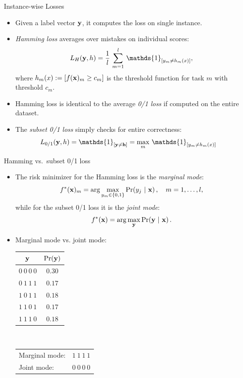 \documentclass[11pt,compress,t,notes=noshow, xcolor=table]{beamer}
\begin{document}
\begin{frame}{Instance-wise Losses}
	\begin{itemize}
		
        \item Given a label vector $\mathbf{y}$, it computes the loss on single instance. 

		\item \emph{Hamming loss} averages over mistakes on individual scores:    
		$$
		\displaystyle L_H(\yv, h) = \frac{1}{l}  \, \sum_{m=1}^l \, \mathds{1}_{[y_m \neq h_m(x)]},
		$$
        where $h_m(x) := [f(\mathbf{x})_m \geq c_m]$ is the threshold function for task $m$ with threshold $c_m$. 
        
        \item Hamming loss is identical to the average \emph{0/1 loss} if computed on the entire dataset.

		
		\item The \emph{subset 0/1 loss} simply checks for entire correctness:  
		\begin{align*}
			\displaystyle L_{0/1}(\yv, h) & = \mathds{1}_{[ \yv \neq \mathbf{h} ]}  = \max_m \, \mathds{1}_{[y_m \neq  h_m(x)]}
		\end{align*}
		
	\end{itemize}
\end{frame}


\begin{frame}{Hamming vs.\ subset 0/1 loss}
	\begin{itemize}
		\item The risk minimizer for the Hamming loss is the  \emph{marginal mode}:
		$$
		f^*(\mathbf{x})_m = \arg \max_{y_m \in \{0,1\}} \Pr( y_j  ~|~ \mathbf{x} )\,, \quad m = 1,\ldots,l,
		$$
		while for the subset 0/1 loss it is the \emph{joint mode}:
		$$
		f^*(\mathbf{x}) = \arg \max_{\mathbf{y}} \Pr(\mathbf{y} ~|~ \mathbf{x}) \,.
		$$
		\item Marginal mode vs. joint mode:\\[6pt]
		\begin{center}
			\begin{tabular}{@{}cc@{}}
				\toprule
				$\mathbf{y}$ & $\Pr(\mathbf{y})$ \\
				\hline
				$0~0~0~0$ & $0.30$ \\
				$0~1~1~1$ & $0.17$ \\
				$1~0~1~1$ & $0.18$ \\
				$1~1~0~1$ & $0.17$ \\
				$1~1~1~0$ & $0.18$ \\
				\toprule
			\end{tabular}
			$\qquad$
			\footnotesize{
				\begin{tabular}{lr}
					Marginal mode: & $1~1~1~1$ \\
					Joint mode: & $0~0~0~0$ \\
				\end{tabular}
			}
		\end{center}
	\end{itemize}
\end{frame}
\end{document}
